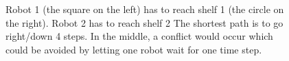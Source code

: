 \documentclass[runningheads]{llncs}
\begin{document}
\begin{figure}[h]
\caption{Robot 1 (the square on the left) has to reach shelf 1 (the circle on the right). Robot 2 has to reach shelf 2 The shortest path is to go right/down 4 steps. In the middle, a conflict would occur which could be avoided by letting one robot wait for one time step.}
\label{fig:mapf}
\end{figure}
\end{document}

